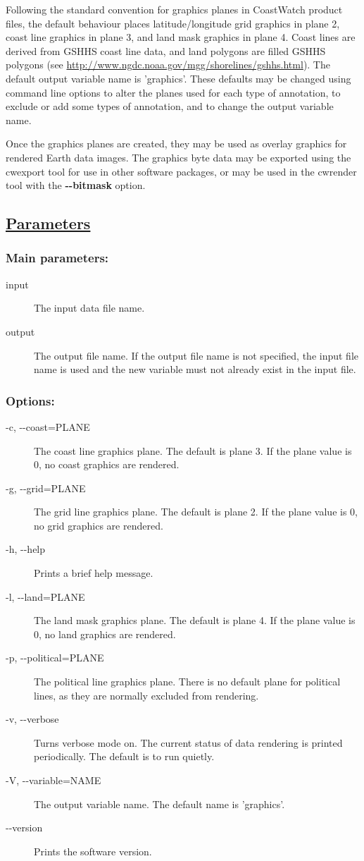  Following the standard convention for graphics planes in CoastWatch product files, the default behaviour places latitude/longitude grid graphics in plane 2, coast line graphics in plane 3, and land mask graphics in plane 4. Coast lines are derived from GSHHS coast line data, and land polygons are filled GSHHS polygons (see \url{http://www.ngdc.noaa.gov/mgg/shorelines/gshhs.html}). The default output variable name is 'graphics'. These defaults may be changed using command line options to alter the planes used for each type of annotation, to exclude or add some types of annotation, and to change the output variable name.


 Once the graphics planes are created, they may be used as overlay graphics for rendered Earth data images. The graphics byte data may be exported using the cwexport tool for use in other software packages, or may be used in the cwrender tool with the \textbf{-{-}bitmask}
 option.
\subsection*{\underline{Parameters}}
\subsubsection*{Main parameters:}
\begin{description}
\item[ input ] The input data file name. 
\item[ output ] The output file name. If the output file name is not specified, the input file name is used and the new variable must not already exist in the input file. 

\end{description}
\subsubsection*{Options:}
\begin{description}
\item[ -c, -{-}coast=PLANE ] The coast line graphics plane. The default is plane 3. If the plane value is 0, no coast graphics are rendered. 
\item[ -g, -{-}grid=PLANE ] The grid line graphics plane. The default is plane 2. If the plane value is 0, no grid graphics are rendered. 
\item[ -h, -{-}help ] Prints a brief help message. 
\item[ -l, -{-}land=PLANE ] The land mask graphics plane. The default is plane 4. If the plane value is 0, no land graphics are rendered. 
\item[ -p, -{-}political=PLANE ] The political line graphics plane. There is no default plane for political lines, as they are normally excluded from rendering. 
\item[ -v, -{-}verbose ] Turns verbose mode on. The current status of data rendering is printed periodically. The default is to run quietly. 
\item[ -V, -{-}variable=NAME ] The output variable name. The default name is 'graphics'. 
\item[-{-}version]Prints the software version.

\end{description}
